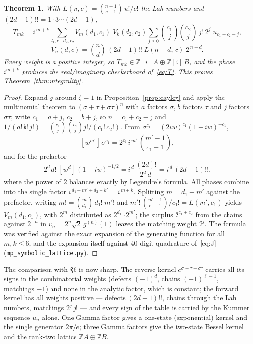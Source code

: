 \documentclass[11pt,a4paper]{article}
\newtheorem{theorem}[proposition]{Theorem}
\newcommand{\Z}{\mathbb{Z}}
\begin{document}
\begin{theorem}\label{thm:formula}
With $L(n,c) = \binom{n-1}{c-1}\, n!/c!$ the Lah numbers and
$(2d-1)!! = 1 \cdot 3 \cdots (2d-1)$,
\[
  T_{mk} = i^{\,m+k} \sum_{d_1, c_1, d_2, c_2}
  V_m(d_1, c_1)\; V_k(d_2, c_2)
  \sum_{j \ge 0} \binom{c_1}{j} \binom{c_2}{j}\, j!\; 2^j\;
  u_{c_1 + c_2 - j},
\]
\[
  V_n(d, c) = \binom{n}{d}\, (2d-1)!!\; L(n-d,\, c)\; 2^{\,n-d}.
\]
Every weight is a positive integer, so
$T_{mk} \in \Z[i]\, A \oplus \Z[i]\, B$, and the phase $i^{m+k}$
produces the real/imaginary checkerboard of~\eqref{eq:T}. This proves
Theorem~\ref{thm:integrality}.
\end{theorem}

\begin{proof}
Expand $g$ around $\zeta = 1$ in Proposition~\ref{prop:cayley} and
apply the multinomial theorem to
$(\sigma + \tau + \sigma\tau)^n$ with $a$ factors $\sigma$, $b$
factors $\tau$ and $j$ factors $\sigma\tau$; write $c_1 = a + j$,
$c_2 = b + j$, so $n = c_1 + c_2 - j$ and
$1/(a!\, b!\, j!) = \binom{c_1}{j}\binom{c_2}{j} j! / (c_1!\, c_2!)$.
From $\sigma^{c_1} = (2iw)^{c_1} (1-iw)^{-c_1}$,
\[
  [w^{m'}]\, \sigma^{c_1}
  = 2^{c_1}\, i^{\,m'}\, \binom{m'-1}{c_1-1},
\]
and for the prefactor
\[
  2^d\, d!\; [w^d]\, (1-iw)^{-1/2}
  = i^{\,d}\, \frac{(2d)!}{2^d\, d!}
  = i^{\,d}\, (2d-1)!!,
\]
where the power of $2$ balances exactly by Legendre's formula. All
phases combine into the single factor
$i^{\,d_1 + m' + d_2 + k'} = i^{\,m+k}$. Splitting $m = d_1 + m'$
against the prefactor, writing
$m! = \binom{m}{d_1}\, d_1!\; m'!$ and
$m'!\, \binom{m'-1}{c_1-1} / c_1! = L(m', c_1)$ yields
$V_m(d_1, c_1)$, with $2^{m}$ distributed as
$2^{d_1} \cdot 2^{m'}$; the surplus
$2^{c_1 + c_2}$ from the chains against $2^{-n}$ in
$u_n = 2^n \sqrt2\, g^{(n)}(1)$ leaves the matching weight $2^j$.
The formula was verified against the exact expansion of the
generating function for all $m, k \le 6$, and the expansion itself
against $40$-digit quadrature of~\eqref{eq:J}
(\texttt{mp\_symbolic\_lattice.py}).
\end{proof}

The comparison with \S6 is now sharp. The reverse kernel
$e^{\sigma+\tau-\sigma\tau}$ carries all its signs in the
combinatorial weights (defects $(-1)^d$, chains $(-1)^{\ell-1}$,
matchings $-1$) and none in the analytic factor, which is constant;
the forward kernel has all weights positive --- defects $(2d-1)!!$,
chains through the Lah numbers, matchings $2^j\, j!$ --- and every
sign of the table is carried by the Kummer sequence $u_n$ alone. One
Gamma factor gives a one-state (exponential) kernel and the single
generator $2\pi/e$; three Gamma factors give the two-state Bessel
kernel and the rank-two lattice $\Z A \oplus \Z B$.
\end{document}
